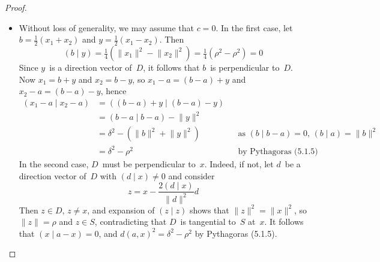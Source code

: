 \documentclass[letterpaper,12pt]{article}
\newcommand{\norm}[1]{\lVert{#1}\rVert}
\newcommand{\innerprod}[2]{({#1}\;|\;{#2})}
\theoremstyle{definition}
\theoremstyle{remark}
\begin{document}
\begin{proof}\
\begin{itemize}[itemsep=0pt]
\item Without loss of generality, we may assume that \(c=0\). In the first case, let \(b=\tfrac{1}{2}(x_1+x_2)\) and \(y=\tfrac{1}{2}(x_1-x_2)\). Then
\[\innerprod{b}{y}=\tfrac{1}{4}(\norm{x_1}^2-\norm{x_2}^2)=\tfrac{1}{4}(\rho^2-\rho^2)=0\]
Since \(y\)~is a direction vector of~\(D\), it follows that \(b\)~is perpendicular to~\(D\). Now \(x_1=b+y\) and \(x_2=b-y\), so \(x_1-a=(b-a)+y\) and \(x_2-a=(b-a)-y\), hence
\begin{align*}
\innerprod{x_1-a}{x_2-a}&=\innerprod{(b-a)+y}{(b-a)-y}&&\\
	&=\innerprod{b-a}{b-a}-\norm{y}^2&&\\
	&=\delta^2-(\norm{b}^2+\norm{y}^2)&&\text{as }\innerprod{b}{b-a}=0\text{, }\innerprod{b}{a}=\norm{b}^2\\
	&=\delta^2-\rho^2&&\text{by Pythagoras (5.1.5)}
\end{align*}
In the second case, \(D\)~must be perpendicular to~\(x\). Indeed, if not, let \(d\)~be a direction vector of~\(D\) with \(\innerprod{d}{x}\ne 0\) and consider
\[z=x-\frac{2\innerprod{d}{x}}{\norm{d}^2}d\]
Then \(z\in D\), \(z\ne x\), and expansion of \(\innerprod{z}{z}\) shows that \(\norm{z}^2=\norm{x}^2\), so \(\norm{z}=\rho\) and \(z\in S\), contradicting that \(D\)~is tangential to~\(S\) at~\(x\). It follows that \(\innerprod{x}{a-x}=0\), and \(d(a,x)^2=\delta^2-\rho^2\) by Pythagoras (5.1.5).


\end{itemize}
\end{proof}
\end{document}
